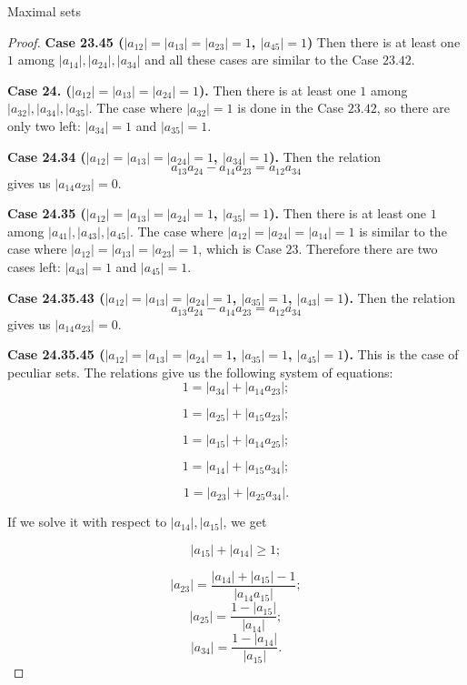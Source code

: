 \documentclass[12pt]{article}
\begin{document}
\begin{section}{Maximal sets}
\begin{proof}
        \textbf{Case 23.45 ($|a_{12}|=|a_{13}|=|a_{23}|=1$, $|a_{45}|=1$)} Then there is at least one $1$ among $|a_{14}|,|a_{24}|,|a_{34}|$ and all these cases are similar to the Case $23.42$.
        
    
        \textbf{Case 24. ($|a_{12}|=|a_{13}|=|a_{24}|=1$).} Then there is at least one $1$ among $|a_{32}|,|a_{34}|,|a_{35}|$. The case where $|a_{32}|=1$ is done in the Case $23.42$, so there are only two left: $|a_{34}|=1$ and $|a_{35}|=1$.
    
        \textbf{Case 24.34 ($|a_{12}|=|a_{13}|=|a_{24}|=1$, $|a_{34}|=1$).} Then the relation 
        $$
            a_{13}a_{24} - a_{14}a_{23} = a_{12}a_{34}
        $$
        gives us $|a_{14}a_{23}|=0$.
    
        \textbf{Case 24.35 ($|a_{12}|=|a_{13}|=|a_{24}|=1$, $|a_{35}|=1$).}  Then there is at least one $1$ among $|a_{41}|,|a_{43}|,|a_{45}|$. The case where $|a_{12}|=|a_{24}| = |a_{14}| = 1$ is similar to the case where $|a_{12}|=|a_{13}| = |a_{23}|=1$, which is Case $23$. Therefore there are two cases left: $|a_{43}|=1$ and $|a_{45}|=1$.
    
         \textbf{Case 24.35.43 ($|a_{12}|=|a_{13}|=|a_{24}|=1$, $|a_{35}|=1$, $|a_{43}|=1$).} Then the relation 
        $$
            a_{13}a_{24} - a_{14}a_{23} = a_{12}a_{34}
        $$
        gives us $|a_{14}a_{23}|=0$.
    
          \textbf{Case 24.35.45 ($|a_{12}|=|a_{13}|=|a_{24}|=1$, $|a_{35}|=1$, $|a_{45}|=1$).} This is the case of peculiar sets. The relations give us the following system of equations: 
    $$
        1 = |a_{34}| + |a_{14}a_{23}|;
    $$
    
    $$
        1 = |a_{25}| + |a_{15}a_{23}|;
    $$
    
    $$
        1 = |a_{15}| + |a_{14}a_{25}|;
    $$
    
    $$
        1 = |a_{14}| + |a_{15}a_{34}|;
    $$
    
    $$
        1 = |a_{23}| + |a_{25}a_{34}|.
    $$
    
    If we solve it with respect to $|a_{14}|,|a_{15}|$, we get 
    
        $$
            |a_{15}| + |a_{14}|\geq 1;
        $$ 
        
        $$
            |a_{23}| = \frac{|a_{14}| + |a_{15}| - 1}{|a_{14}a_{15}|};
        $$
        $$
            |a_{25}| = \frac{1-|a_{15}|}{|a_{14}|};
        $$
        $$
            |a_{34}| = \frac{1-|a_{14}|}{|a_{15}|}.
        $$
        
    \end{proof}

    
\end{section}
\end{document}
